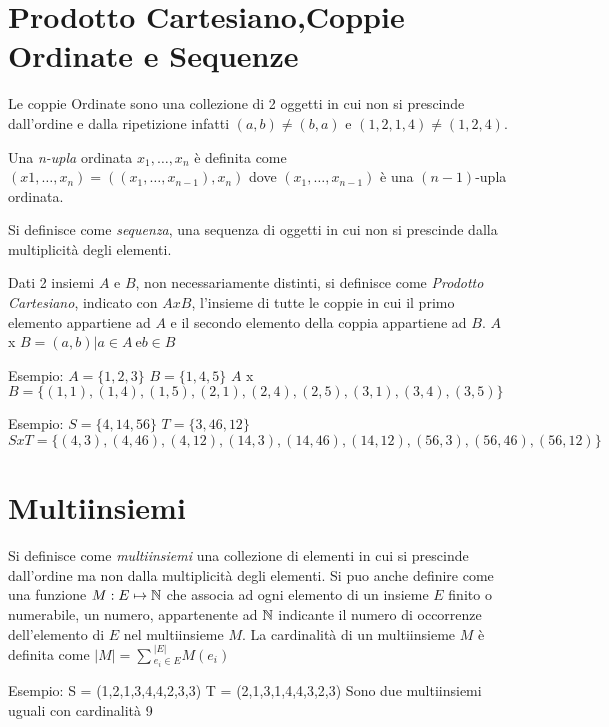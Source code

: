 \section{Prodotto Cartesiano,Coppie Ordinate e Sequenze}
Le coppie Ordinate sono una collezione di 2 oggetti in cui non si prescinde
dall'ordine e dalla ripetizione infatti $(a,b) \neq (b,a)$ e $(1,2,1,4) \neq (1,2,4)$.

Una \emph{n-upla} ordinata $x_1,\dots,x_n$ è definita come $(x1,\dots,x_n) = ( (x_1,\dots,x_{n-1}),x_n)$
dove $(x_1,\dots,x_{n-1})$ è una $(n-1)$-upla ordinata.

Si definisce come \emph{sequenza}, una sequenza di oggetti in cui non si prescinde
dalla multiplicità degli elementi.

Dati 2 insiemi $A$ e $B$, non necessariamente  distinti, si definisce come \textit{Prodotto Cartesiano},
indicato con $A x B$, l'insieme di tutte le coppie in cui il primo elemento appartiene ad $A$
e il secondo elemento della coppia appartiene ad $B$.\newline
$A$ x $B = {(a,b) | a \in A \ \text{e} b \in B} $

Esempio:\newline
$A = \{1,2,3\}$ \newline
$B = \{1,4,5\}$ \newline
$A$ x $B = \{(1,1),(1,4),(1,5),(2,1),(2,4),(2,5),(3,1),(3,4),(3,5)\} $

Esempio:
$S = \{ 4,14,56 \}$
$T = \{ 3,46,12 \}$
$S x T = \{(4,3),(4,46),(4,12),(14,3),(14,46),(14,12),(56,3),(56,46),(56,12) \}$

\section{Multiinsiemi}
Si definisce come \emph{multiinsiemi} una collezione di elementi in cui si prescinde
dall'ordine ma non dalla multiplicità degli elementi.\newline
Si puo anche definire come una funzione $M:E \mapsto \mathbb{N}$ che associa ad ogni elemento
di un insieme $E$ finito o numerabile, un numero, appartenente ad $\mathbb{N}$ indicante
il numero di occorrenze dell'elemento di $E$ nel multiinsieme $M$.\newline
La cardinalità di un multiinsieme $M$ è definita come $\displaystyle |M| = \sum{_{e_i \in E} ^ {|E|}} M(e_i)$

Esempio:
S = (1,2,1,3,4,4,2,3,3)\newline
T = (2,1,3,1,4,4,3,2,3)\newline
Sono due multiinsiemi uguali con cardinalità 9

